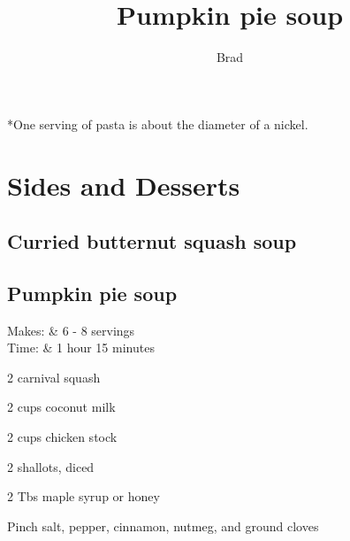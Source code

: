 \documentclass{RecipeBook}
\begin{document}


*One serving of pasta is about the diameter of a nickel.


\section{Sides and Desserts}

\subsection{Curried butternut squash soup}
\subsection{Pumpkin pie soup}
\author{Brad}

\title{Pumpkin pie soup}

\begin{info}
	Makes: & 6 - 8 servings \\
	Time: & 1 hour 15 minutes \\
\end{info}

\begin{ingredients}
	\item{2 carnival squash}
	\item{2 cups coconut milk}
	\item{2 cups chicken stock}
	\item{2 shallots, diced}
	\item{2 Tbs maple syrup or honey}
	\item{Pinch salt, pepper, cinnamon, nutmeg, and ground cloves}
\end{ingredients}

\end{document}
